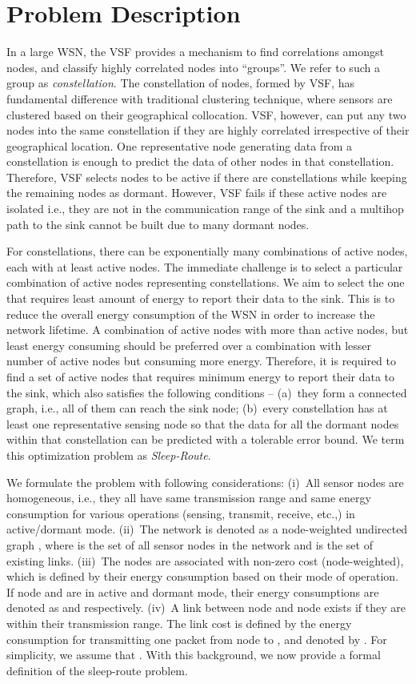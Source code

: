 \documentclass[conference]{IEEEtran}
\begin{document}
\section{Problem Description}
\label{sec:problem}
In a large WSN, the VSF provides a mechanism to find correlations amongst nodes, and classify highly correlated nodes into ``groups''. We refer to such a group as \emph{constellation}. The constellation of nodes, formed by VSF, has fundamental difference with traditional clustering technique, where sensors are clustered based on their geographical collocation. VSF, however, can put any two nodes into the same constellation if they are highly correlated irrespective of their geographical location. One representative node generating data from a constellation is enough to predict the data of other nodes in that constellation. Therefore, VSF selects  nodes to be active if there are  constellations while keeping the remaining nodes as dormant. However, VSF fails if these active nodes are isolated i.e., they are not in the communication range of the sink and a multihop path to the sink cannot be built due to many dormant nodes. 

For  constellations, there can be exponentially many combinations of active nodes, each with at least  active nodes. The immediate challenge is to select a particular combination of active nodes representing  constellations. We aim to select the one that requires least amount of energy to report their data to the sink. This is to reduce the overall energy consumption of the WSN in order to increase the network lifetime.  A combination of active nodes with more than  active nodes, but least energy consuming should be preferred over a combination with lesser number of active nodes but consuming more energy. Therefore, it is required to find a set of active nodes that requires minimum energy to report their data to the sink, which also satisfies the following conditions -- (a)~they form a connected graph, i.e., all of them can reach the sink node; (b)~every constellation has at least one representative sensing node so that the data for all the dormant nodes within that constellation can be predicted with a tolerable error bound. We term this optimization problem as \emph{Sleep-Route}.

We formulate the problem with following considerations: (i)~All sensor nodes are homogeneous, i.e., they all have same transmission range and same energy consumption for various operations (sensing, transmit, receive, etc.,) in active/dormant mode.
(ii)~The network is denoted as a node-weighted undirected graph , where  is the set of all sensor nodes in the network and  is the set of existing links. 
(iii)~The nodes are associated with non-zero cost (node-weighted), which is defined by their energy consumption based on their mode of operation. If node  and  are in active and dormant mode, their energy consumptions are denoted as  and  respectively.
(iv)~A link between node  and node  exists if they are within their transmission range. The link cost is defined by the energy consumption for transmitting one packet from node  to , and denoted by . For simplicity, we assume that .
With this background, we now provide a formal definition of the sleep-route problem.
\end{document}
